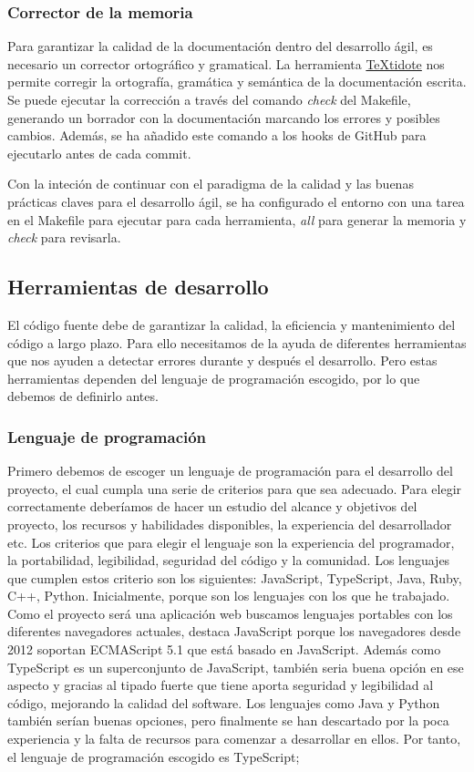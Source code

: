 \subsubsection{Corrector de la memoria}
Para garantizar la calidad de la documentación dentro del desarrollo ágil, es necesario un corrector ortográfico y gramatical.
La herramienta \href{https://github.com/sylvainhalle/textidote}{TeXtidote} nos permite corregir la ortografía, gramática y semántica de la documentación escrita.
Se puede ejecutar la corrección a través del comando \textit{check} del Makefile, generando un borrador con la documentación marcando los errores y posibles cambios.
Además, se ha añadido este comando a los hooks de GitHub para ejecutarlo antes de cada commit.

Con la inteción de continuar con el paradigma de la calidad y las buenas prácticas claves para el desarrollo ágil, se ha configurado el entorno con
una tarea en el Makefile para ejecutar para cada herramienta, \textit{all} para generar la memoria y \textit{check} para revisarla.

\subsection{Herramientas de desarrollo}
El código fuente debe de garantizar la calidad, la eficiencia y mantenimiento del código a largo plazo. Para ello necesitamos de la ayuda de diferentes herramientas
que nos ayuden a detectar errores durante y después el desarrollo. Pero estas herramientas dependen del lenguaje de programación escogido, por lo que debemos de definirlo antes.

\subsubsection{Lenguaje de programación}
Primero debemos de escoger un lenguaje de programación para el desarrollo del proyecto, el cual cumpla una serie de criterios para que sea adecuado.
Para elegir correctamente deberíamos de hacer un estudio del alcance y objetivos del proyecto, los recursos y habilidades disponibles, la experiencia del desarrollador etc.
Los criterios que para elegir el lenguaje son la experiencia del programador, la portabilidad, legibilidad, seguridad del código y la comunidad.
Los lenguajes que cumplen estos criterio son los siguientes: JavaScript, TypeScript, Java, Ruby, C++, Python. Inicialmente, porque son los lenguajes con los que he trabajado.
Como el proyecto será una aplicación web buscamos lenguajes portables con los diferentes navegadores actuales, destaca JavaScript porque los navegadores desde 2012 soportan ECMAScript 5.1 que está basado en JavaScript.
Además como TypeScript es un superconjunto de JavaScript, también seria buena opción en ese aspecto y gracias al tipado fuerte que tiene aporta seguridad y legibilidad al código, mejorando la calidad del software.
Los lenguajes como Java y Python también serían buenas opciones, pero finalmente se han descartado por la poca experiencia y la falta de recursos para comenzar a desarrollar en ellos.
Por tanto, el lenguaje de programación escogido es TypeScript;

